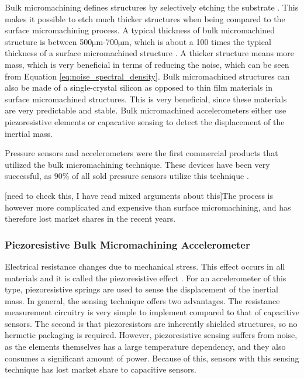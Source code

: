 Bulk micromachining defines structures by selectively etching the substrate \cite[p.~7]{kaajakari09}. This makes it possible to etch much thicker structures when being compared to the surface micromachining process. A typical thickness of bulk micromachined structure is between 500$\si{\micro\meter}$-700$\si{\micro\meter}$, which is about a 100 times the typical thickness of a surface micromachined structure \cite[p.~7]{kaajakari09}. A thicker structure means more mass, which is very beneficial in terms of reducing the noise, which can be seen from Equation \ref{eq:noise_spectral_density}. Bulk micromachined structures can also be made of a single-crystal silicon as opposed to thin film materials in surface micromachined structures. This is very beneficial, since these materials are very predictable and stable. Bulk micromachined accelerometers either use piezoresistive elements or capacative sensing to detect the displacement of the inertial mass.

Pressure sensors and accelerometers were the first commercial products that utilized the bulk micromachining technique. These devices have been very successful, as 90\% of all sold pressure sensors utilize this technique \cite[p.~7]{kaajakari09}. 

[need to check this, I have read mixed arguments about this]The process is however more complicated and expensive than surface micromachining, and has therefore lost market shares in the recent years.

\subsubsection{Piezoresistive Bulk Micromachining Accelerometer}

Electrical resistance changes due to mechanical stress. This effect occurs in all materials and it is called the piezoresistive effect \cite[p.~73]{kaajakari09}. For an accelerometer of this type, piezoresistive springs are used to sense the displacement of the inertial mass. In general, the sensing technique offers two advantages. The resistance measurement circuitry is very simple to implement compared to that of capacitive sensors. The second is that piezoresistors are inherently shielded structures, so no hermetic packaging is required. However, piezoresistive sensing suffers from noise, as the elements themselves has a large temperature dependency, and they also consumes a significant amount of power. Because of this, sensors with this sensing technique has lost market share to capacitive sensors.

